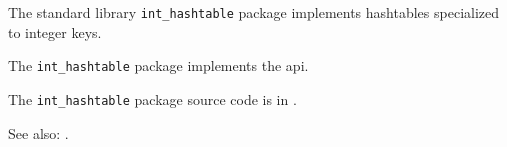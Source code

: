 
The standard library {\tt int\_hashtable} package implements hashtables specialized to integer keys.

The {\tt int\_hashtable} package implements the  api.

The {\tt int\_hashtable} package source code is in .

See also:  .


